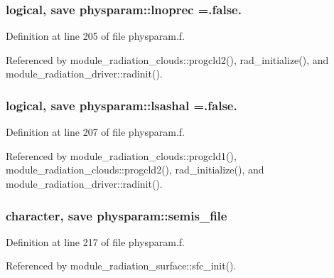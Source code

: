 \subsubsection[{\texorpdfstring{lnoprec}{lnoprec}}]{\setlength{\rightskip}{0pt plus 5cm}logical, save physparam\+::lnoprec =.false.}\hypertarget{namespacephysparam_acb52e2553c9e106bd8885fd09c6e2dd2}{}\label{namespacephysparam_acb52e2553c9e106bd8885fd09c6e2dd2}


Definition at line 205 of file physparam.\+f.



Referenced by module\+\_\+radiation\+\_\+clouds\+::progcld2(), rad\+\_\+initialize(), and module\+\_\+radiation\+\_\+driver\+::radinit().

\subsubsection[{\texorpdfstring{lsashal}{lsashal}}]{\setlength{\rightskip}{0pt plus 5cm}logical, save physparam\+::lsashal =.false.}\hypertarget{namespacephysparam_abd79346fa2177075241fe6c5bc77004d}{}\label{namespacephysparam_abd79346fa2177075241fe6c5bc77004d}


Definition at line 207 of file physparam.\+f.



Referenced by module\+\_\+radiation\+\_\+clouds\+::progcld1(), module\+\_\+radiation\+\_\+clouds\+::progcld2(), rad\+\_\+initialize(), and module\+\_\+radiation\+\_\+driver\+::radinit().

\subsubsection[{\texorpdfstring{semis\+\_\+file}{semis_file}}]{\setlength{\rightskip}{0pt plus 5cm}character, save physparam\+::semis\+\_\+file}\hypertarget{namespacephysparam_a3f616dfa9c7792a45732a16e8e0433c2}{}\label{namespacephysparam_a3f616dfa9c7792a45732a16e8e0433c2}


Definition at line 217 of file physparam.\+f.



Referenced by module\+\_\+radiation\+\_\+surface\+::sfc\+\_\+init().

